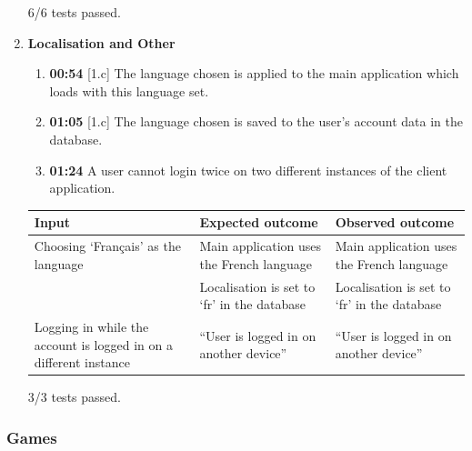 \documentclass{article}
\begin{document}
\begin{enumerate}
    6/6 tests passed. \\

    \item \textbf{Localisation and Other}

    \begin{enumerate}
        \item \textbf{00:54} [1.c] The language chosen is applied to the main application which loads with this language set.
        \item \textbf{01:05} [1.c] The language chosen is saved to the user's account data in the database.
        \item \textbf{01:24} A user cannot login twice on two different instances of the client application.
    \end{enumerate}

    \begin{table}[H]
    \centering
        \begin{tabularx}{\textwidth}{|L|L|L|}
        \hline
        \textbf{Input} & \textbf{Expected outcome} & \textbf{Observed outcome} \\\hline
        Choosing `Français' as the language & Main application uses the French language & Main application uses the French language \\
        & Localisation is set to `fr' in the database & Localisation is set to `fr' in the database \\\hline
        Logging in while the account is logged in on a different instance & ``User is logged in on another device'' & ``User is logged in on another device'' \\\hline
        \end{tabularx}
    \end{table}

    3/3 tests passed. \\

\end{enumerate}

\subsubsection{Games}
\end{document}

